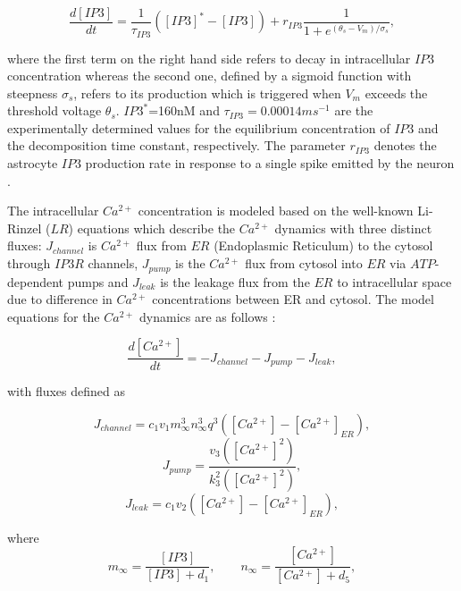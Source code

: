 \documentclass[%
 aip,
 amsmath,amssymb,
 reprint,%
]{revtex4-1}
\begin{document}
	\begin{equation}
		\frac{d[IP3]}{dt}=\frac{1}{\tau_{IP3}}([IP3]^{*}-[IP3])+r_{IP3} \frac{1}{1+e^{(\theta_{s}-V_{m})/\sigma_{s}}},
	\end{equation}
	
	\noindent where the first term on the right hand side refers to decay in intracellular $IP3$ concentration whereas the second one, defined by a sigmoid function with steepness $\sigma_{s}$, refers to its production which is triggered when $V_{m}$ exceeds the threshold voltage $\theta_{s}$. $IP3^{*}$=160nM and $\tau_{IP3}=0.00014 ms^{-1}$ are the experimentally determined values for the equilibrium concentration of $IP3$ and the decomposition time constant, respectively. The parameter $r_{IP3}$ denotes the astrocyte $IP3$ production rate in response to a single spike emitted by the neuron \cite{amiri2011}.
	
	The intracellular $Ca^{2+}$ concentration is modeled based on the well-known Li-Rinzel ($LR$) equations which describe the $Ca^{2+}$ dynamics with three distinct fluxes: $J_{channel}$ is $Ca^{2+}$ flux from $ER$ (Endoplasmic Reticulum) to the cytosol through $IP3R$ channels, $J_{pump}$ is the $Ca^{2+}$ flux from cytosol into $ER$ via $ATP$-dependent pumps and $J_{leak}$ is the leakage flux from the $ER$ to intracellular space due to difference in $Ca^{2+}$ concentrations between ER and cytosol. The model equations for the $Ca^{2+}$  dynamics are as follows \cite{lirinzel1994, manninen2018}:
	
		\begin{equation}
		\frac{d[Ca^{2+}]}{dt}=-J_{channel}-J_{pump}-J_{leak},
	\end{equation}
	
\noindent with fluxes defined as
		
	\begin{equation}
		J_{channel}=c_{1}v_{1}m_{\infty}^{3}n_{\infty}^{3}q^{3}([Ca^{2+}]-[Ca^{2+}]_{ER}),
	\end{equation}
	\begin{equation}
		J_{pump}=\frac {v_{3}([Ca^{2+}]^{2})}{k_{3}^{2}([Ca^{2+}]^{2})},
	\end{equation}
	\begin{equation}
		J_{leak}=c_{1}v_{2}([Ca^{2+}]-[Ca^{2+}]_{ER}),
	\end{equation}
	
	where
	\begin{equation}
		m_{\infty}=\frac {[IP3]} {[IP3]+d_{1}},            \qquad            n_{\infty}=\frac {[Ca^{2+}]} {[Ca^{2+}]+d_{5}},  
	\end{equation}
	
\end{document}
